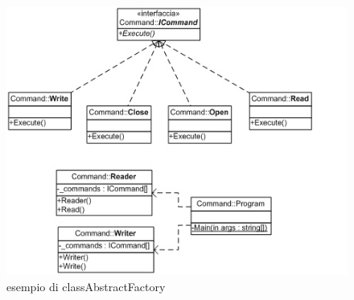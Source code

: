 \documentclass[a4paper,10pt]{article}
\begin{document}
                        \begin{figure}[h!] %
                            \centering
                            \includegraphics[scale=0.75]{img/IC65512}	
                            \caption{esempio di classAbstractFactory}
                        \end{figure}
                
                        \newpage
\end{document}
